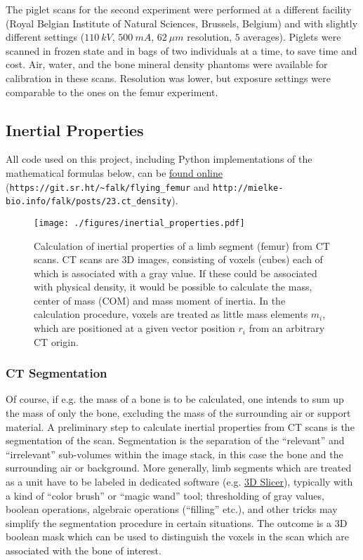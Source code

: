 The piglet scans for the second experiment were performed at a different facility (Royal Belgian Institute of Natural Sciences, Brussels, Belgium) and with slightly different settings (\(110\ kV\), \(500\ mA\), \(62\ \mu m\) resolution, \(5\) averages).
Piglets were scanned in frozen state and in bags of two individuals at a time, to save time and cost.
Air, water, and the bone mineral density phantoms were available for calibration in these scans.
Resolution was lower, but exposure settings were comparable to the ones on the femur experiment.


\subsection{Inertial Properties}
\label{sec:orgbc6ffe5}

All code used on this project, including Python implementations of the mathematical formulas below, can be \href{https://git.sr.ht/\~falk/flying\_femur}{found online} (\nolinkurl{https://git.sr.ht/~falk/flying_femur} and \nolinkurl{http://mielke-bio.info/falk/posts/23.ct_density}).

\begin{figure}[p]
\centering
\texttt{[image: ./figures/inertial\_properties.pdf]}
\caption{\label{fig:inertials}Calculation of inertial properties of a limb segment (femur) from CT scans. CT scans are 3D images, consisting of voxels (cubes) each of which is associated with a gray value. If these could be associated with physical density, it would be possible to calculate the mass, center of mass (COM) and mass moment of inertia. In the calculation procedure, voxels are treated as little mass elements \(m_{i}\), which are positioned at a given vector position \(r_{i}\) from an arbitrary CT origin.}
\end{figure}

\subsubsection{CT Segmentation}
\label{sec:org8443a86}
Of course, if e.g. the mass of a bone is to be calculated, one intends to sum up the mass of only the bone, excluding the mass of the surrounding air or support material.
A preliminary step to calculate inertial properties from CT scans is the segmentation of the scan.
Segmentation is the separation of the ``relevant'' and ``irrelevant'' sub-volumes within the image stack, in this case the bone and the surrounding air or background.
More generally, limb segments which are treated as a unit have to be labeled in dedicated software (e.g. \href{https://www.slicer.org}{3D Slicer}), typically with a kind of ``color brush'' or ``magic wand'' tool; thresholding of gray values, boolean operations, algebraic operations (``filling'' etc.), and other tricks may simplify the segmentation procedure in certain situations.
The outcome is a 3D boolean mask which can be used to distinguish the voxels in the scan which are associated with the bone of interest.

